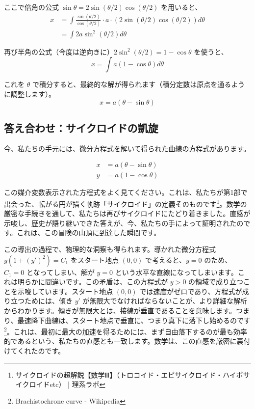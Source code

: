 \documentclass[a4paper,12pt]{bxjsarticle}
\begin{document}
\begin{enumerate}
ここで倍角の公式 $\sin\theta=2\sin(\theta/2)\cos(\theta/2)$ を用いると、
\begin{align}
x &= \int \frac{\sin(\theta/2)}{\cos(\theta/2)} \cdot a \cdot (2\sin(\theta/2)\cos(\theta/2)) d\theta \\
&= \int 2a \sin^2(\theta/2) d\theta
\end{align}

再び半角の公式（今度は逆向きに）$2\sin^2(\theta/2)=1-\cos\theta$ を使うと、
\begin{equation}
x=\int a(1-\cos\theta)d\theta
\end{equation}

これを $\theta$ で積分すると、最終的な解が得られます（積分定数は原点を通るように調整します）。
\begin{equation}
x=a(\theta-\sin\theta)
\end{equation}
\end{enumerate}

\subsection{答え合わせ：サイクロイドの凱旋}

今、私たちの手元には、微分方程式を解いて得られた曲線の方程式があります。

\begin{align}
x&=a(\theta-\sin\theta)\\
y&=a(1-\cos\theta)
\end{align}

この媒介変数表示された方程式をよく見てください。これは、私たちが第1部で出会った、転がる円が描く軌跡「サイクロイド」の定義そのものです\footnote{サイクロイドの超解説【数学Ⅲ】（トロコイド・エピサイクロイド・ハイポサイクロイドetc） | 理系ラボ}。数学の厳密な手続きを通して、私たちは再びサイクロイドにたどり着きました。直感が示唆し、歴史が語り継いできた答えが、今、私たちの手によって証明されたのです。これは、この冒険の山頂に到達した瞬間です。

この導出の過程で、物理的な洞察も得られます。導かれた微分方程式 $y(1+(y')^2)=C_1$ をスタート地点 $(0,0)$ で考えると、$y=0$ のため、$C_1=0$ となってしまい、解が $y=0$ という水平な直線になってしまいます。これは明らかに間違いです。この矛盾は、この方程式が $y>0$ の領域で成り立つことを示唆しています。スタート地点 $(0,0)$ では速度がゼロであり、方程式が成り立つためには、傾き $y'$ が無限大でなければならないことが、より詳細な解析からわかります。傾きが無限大とは、接線が垂直であることを意味します。つまり、最速降下曲線は、スタート地点で垂直に、つまり真下に落下し始めるのです\footnote{Brachistochrone curve - Wikipedia}。これは、最初に最大の加速を得るためには、まず自由落下するのが最も効率的であるという、私たちの直感とも一致します。数学は、この直感を厳密に裏付けてくれたのです。
\end{document}
